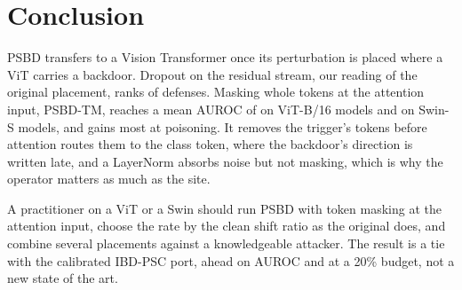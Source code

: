 \section{Conclusion}
\label{sec:conclusion}

PSBD transfers to a Vision Transformer once its perturbation is placed where a ViT carries a backdoor. Dropout on the residual stream, our reading of the original placement, ranks \DetectorsAurocRankPublished{} of \DetectorsAurocDefensesRanked{} defenses. Masking whole tokens at the attention input, PSBD-TM, reaches a mean AUROC of \HeadlineAurocAdaptive{} on \PanelCellsCached{} ViT-B/16 models and \SwinRecommendedAurocAdaptive{} on \SwinCells{} Swin-S models, and gains most at \PanelRateLow{} poisoning. It removes the trigger's tokens before attention routes them to the class token, where the backdoor's direction is written late, and a LayerNorm absorbs noise but not masking, which is why the operator matters as much as the site.

A practitioner on a ViT or a Swin should run PSBD with token masking at the attention input, choose the rate by the clean shift ratio as the original does, and combine several placements against a knowledgeable attacker. The result is a tie with the calibrated IBD-PSC port, \DetectorsAurocMargin{} ahead on AUROC and \DetectorsTprTwoZeroMargin{} at a 20\% budget, not a new state of the art.

